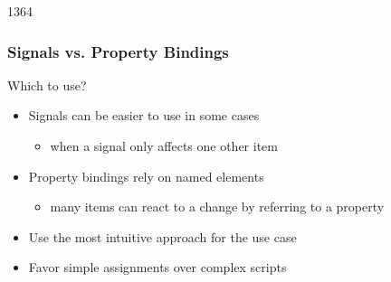 \begin{slide}{1364}\frametitle{Signals vs. Property Bindings}

Which to use?

\begin{itemize}
\item Signals can be easier to use in some cases
  \begin{itemize}
  \item when a signal only affects one other item
  \end{itemize}
\item Property bindings rely on named elements
  \begin{itemize}
  \item many items can react to a change by referring to a property
  \end{itemize}
\item Use the most intuitive approach for the use case
\item Favor simple assignments over complex scripts
\end{itemize}


\end{slide}


